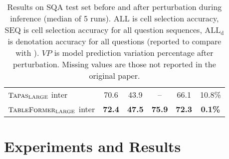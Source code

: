 \documentclass[11pt]{article}
\begin{document}
\begin{table}
\begin{tabular}{lccc|cc}
$\textsc{Tapas}_{\text{LARGE}}$  inter      & 70.6          & 43.9          &      --            & 66.1          & 10.8\%\\
$\textsc{TableFormer}_{\text{LARGE}}$ inter & \textbf{72.4} & \textbf{47.5} & \textbf{75.9}    & \textbf{72.3} & \textbf{0.1\%}      
\\\bottomrule
\end{tabular}
\caption{\label{tab:widgets1} Results on SQA test set before and after perturbation during inference (median of 5 runs). ALL is cell selection accuracy, SEQ is cell selection accuracy for all question sequences, $\text{ALL}_{\text{d}}$ is denotation accuracy for all questions (reported to compare with \citet{liu2021tapex}). $VP$ is model prediction variation percentage after perturbation. Missing values are those not reported in the original paper. }
\end{table}

\section{Experiments and Results}
\end{document}

